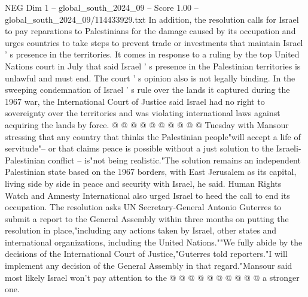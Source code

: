 \begin{textsample}{NEG Dim 1 – global\_south\_2024\_09 – Score 1.00 – global\_south\_2024\_09/114433929.txt}
In addition, the resolution calls for Israel to pay reparations to Palestinians for the damage caused by its occupation and urges countries to take steps to prevent trade or investments that maintain Israel ' s presence in the territories.
It comes in response to a ruling by the top United Nations court in July that said Israel ' s presence in the Palestinian territories is unlawful and must end.
The court ' s opinion also is not legally binding.
In the sweeping condemnation of Israel ' s rule over the lands it captured during the 1967 war, the International Court of Justice said Israel had no right to sovereignty over the territories and was violating international laws against acquiring the lands by force. @ @ @ @ @ @ @ @ @ @ Tuesday with Mansour stressing that any country that thinks the Palestinian people"will accept a life of servitude"-- or that claims peace is possible without a just solution to the Israeli-Palestinian conflict -- is"not being realistic."The solution remains an independent Palestinian state based on the 1967 borders, with East Jerusalem as its capital, living side by side in peace and security with Israel, he said.
Human Rights Watch and Amnesty International also urged Israel to heed the call to end its occupation.
The resolution asks UN Secretary-General Antonio Guterres to submit a report to the General Assembly within three months on putting the resolution in place,"including any actions taken by Israel, other states and international organizations, including the United Nations.""We fully abide by the decisions of the International Court of Justice,"Guterres told reporters."I will implement any decision of the General Assembly in that regard."Mansour said most likely Israel won't pay attention to the @ @ @ @ @ @ @ @ @ @ a stronger one.

\end{textsample}
